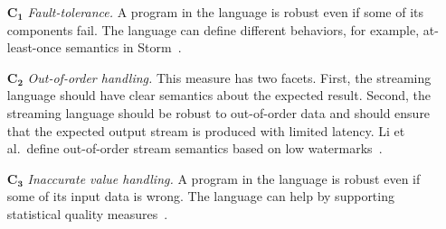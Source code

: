 \begin{itemize}[leftmargin=6mm]
  \item[$\mathbf{C_1}$] \emph{Fault-tolerance.} A program in the
    language is robust even if some of its components fail. The
    language can define different behaviors, for example,
    at-least-once semantics in Storm~\cite{toshniwal_et_al_2014}.
  \item[$\mathbf{C_2}$] \emph{Out-of-order handling.} This measure has
    two facets. First, the streaming language should have clear
    semantics about the expected result. Second, the streaming language should be
    robust to out-of-order data and should ensure that the expected
    output stream is produced with limited latency. Li et al.\ define
    out-of-order stream semantics based on low
    watermarks~\cite{Li:2008:OPN:1453856.1453890}.
  \item[$\mathbf{C_3}$] \emph{Inaccurate value handling.} A program in
    the language is robust even if some of its input data is wrong.
    The language can help by supporting statistical quality
    measures~\cite{wasserkrug_et_al_2008}.
\end{itemize}

